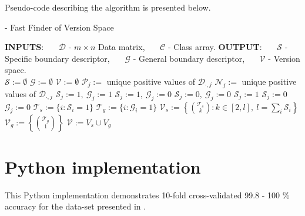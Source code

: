 Pseudo-code describing the algorithm is presented below.
 
\begin{Algorithm}[H]{12cm}
  \caption{ - Fast Finder of Version Space}
  \begin{algorithmic} 
    \State \textbf{INPUTS}: 
    \State \ \ \ $\mathcal{D}$ - $m \times n$ Data matrix,
    \State \ \ \ $\mathcal{C}$ - Class array.
    \State \textbf{OUTPUT}: 
    \State \ \ \ $\mathcal{S}$ - Specific boundary descriptor,
    \State \ \ \ $\mathcal{G}$ - General boundary descriptor, 
    \State \ \ \ $\mathcal{V}$ - Version space.
    \\
    \hrulefill
      \State $\mathcal{S} := \emptyset$
      \State $\mathcal{G} := \emptyset$
      \State $\mathcal{V} := \emptyset$
        \State $\mathcal{P}_j :=$ unique positive values of $\mathcal{D}_{\cdot,j}$
        \State $\mathcal{N}_j :=$ unique positive values of $\mathcal{D}_{\cdot,j}$
          \State $\mathcal{S}_j := 1,\ \mathcal{G}_j := 1$
          \State $\mathcal{S}_j := 1,\ \mathcal{G}_j := 0$
          \State $\mathcal{S}_j := 0,\ \mathcal{G}_j := 0$
            \State $\mathcal{S}_j := 1$
          \Else
            \State $\mathcal{S}_j := 0$
          \EndIf
          \State $\mathcal{G}_j := 0$
        \EndIf
      \EndFor
      \State $\mathcal{T}_s := \{i : \mathcal{S}_i = 1\}$
      \State $\mathcal{T}_g := \{i : \mathcal{G}_i = 1\}$
      \State $\mathcal{V}_s := \left\{\binom{\mathcal{T}_s}{k} : k \in [2,l],\ l = \sum_i \mathcal{S}_i \right\}$
      \State $\mathcal{V}_g := \left\{ \binom{\mathcal{T}_g}{1} \right\}$
      \State $\mathcal{V}   := V_s \cup V_g$
    \EndFunction
  \end{algorithmic}
\end{Algorithm}

\newpage

\section{Python implementation}

This Python implementation demonstrates 10-fold cross-validated 99.8 - 100 \% accuracy for the data-set presented in \cite{mitchell}.


